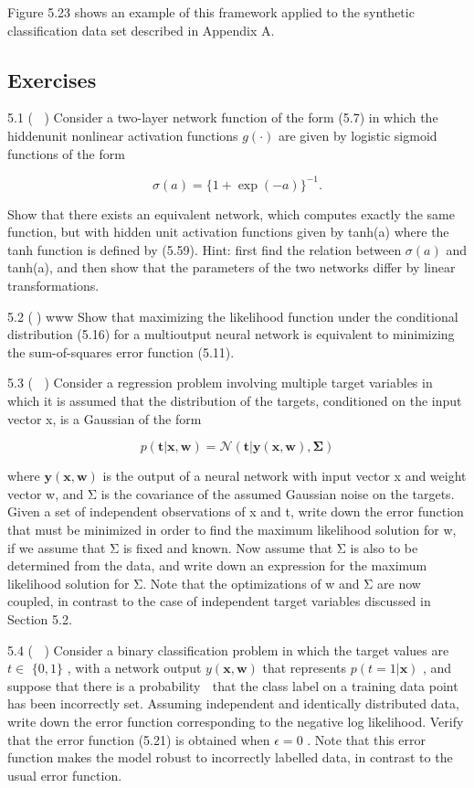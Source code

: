 \documentclass[
  10
]{article}
\begin{document}
Figure 5.23 shows an example of this framework applied to the synthetic
classification data set described in Appendix A.

\subsection{Exercises}\label{exercises-1}

5.1 ( ) Consider a two-layer network function of the form (5.7) in which
the hiddenunit nonlinear activation functions \(g ( \cdot )\) are given
by logistic sigmoid functions of the form

\[
\sigma (a) = \{1 + \exp (- a) \} ^ {- 1}.\tag{5.191}
\]

Show that there exists an equivalent network, which computes exactly the
same function, but with hidden unit activation functions given by
tanh(a) where the tanh function is defined by (5.59). Hint: first find
the relation between \(\sigma ( a )\) and tanh(a), and then show that
the parameters of the two networks differ by linear transformations.

5.2 () www Show that maximizing the likelihood function under the
conditional distribution (5.16) for a multioutput neural network is
equivalent to minimizing the sum-of-squares error function (5.11).

5.3 ( ) Consider a regression problem involving multiple target
variables in which it is assumed that the distribution of the targets,
conditioned on the input vector x, is a Gaussian of the form

\[
p (\mathbf {t} | \mathbf {x}, \mathbf {w}) = \mathcal {N} (\mathbf {t} | \mathbf {y} (\mathbf {x}, \mathbf {w}), \boldsymbol {\Sigma})\tag{5.192}
\]

where \(\mathbf { y } ( \mathbf { x } , \mathbf { w } )\) is the output
of a neural network with input vector x and weight vector w, and Σ is
the covariance of the assumed Gaussian noise on the targets. Given a set
of independent observations of x and t, write down the error function
that must be minimized in order to find the maximum likelihood solution
for w, if we assume that Σ is fixed and known. Now assume that Σ is also
to be determined from the data, and write down an expression for the
maximum likelihood solution for Σ. Note that the optimizations of w and
Σ are now coupled, in contrast to the case of independent target
variables discussed in Section 5.2.

5.4 ( ) Consider a binary classification problem in which the target
values are \(t \in\) \(\{ 0 , 1 \}\) , with a network output
\(y ( \mathbf { x } , \mathbf { w } )\) that represents
\(p ( t = 1 | \mathbf { x } )\) , and suppose that there is a
probability  that the class label on a training data point has been
incorrectly set. Assuming independent and identically distributed data,
write down the error function corresponding to the negative log
likelihood. Verify that the error function (5.21) is obtained when
\(\epsilon = 0\) . Note that this error function makes the model robust
to incorrectly labelled data, in contrast to the usual error function.
\end{document}
